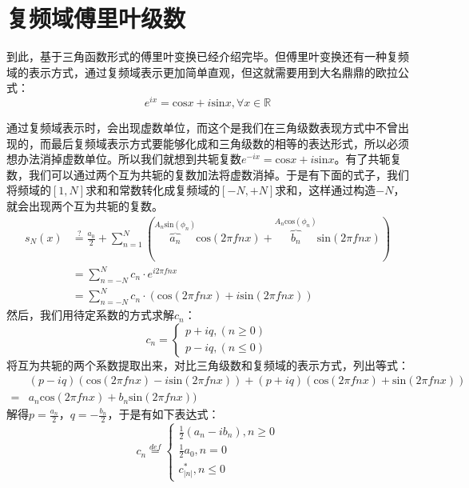 \documentclass[lang=cn,11pt,a4paper,cite=numbers]{elegantpaper}
\begin{document}
\section{复频域傅里叶级数}
  到此，基于三角函数形式的傅里叶变换已经介绍完毕。但傅里叶变换还有一种复频域的表示方式，通过复频域表示更加简单直观，但这就需要用到大名鼎鼎的欧拉公式：
\begin{equation}
  e^{ix}=\mathrm{cos}x+i\mathrm{sin}x, {\forall}x{\in}\mathbb{R}
\end{equation}

  通过复频域表示时，会出现虚数单位，而这个是我们在三角级数表现方式中不曾出现的，而最后复频域表示方式要能够化成和三角级数的相等的表达形式，所以必须想办法消掉虚数单位。所以我们就想到共轭复数$e^{-ix}=\mathrm{cos}x+i\mathrm{sin}x$。有了共轭复数，我们可以通过两个互为共轭的复数加法将虚数消掉。于是有下面的式子，我们将频域的$[1,N]$求和和常数转化成复频域的$[-N,+N]$求和，这样通过构造$-N$，就会出现两个互为共轭的复数。
\begin{equation}
  \begin{aligned}
    s_{N}(x)&\overset{?}{=}\frac{a_{0}}{2}+\sum_{n=1}^{N}\left(\overbrace{a_{n}}^{A_{n}\mathrm{sin}(\phi_{n})}\mathrm{cos}(2{\pi}fnx)+\overbrace{b_{n}}^{A_{n}\mathrm{cos}(\phi_{n})}\mathrm{sin}(2{\pi}fnx)\right)\\
      &=\sum_{n=-N}^{N}c_{n}{\cdot}e^{i2{\pi}fnx}\\
      &=\sum_{n=-N}^{N}c_{n}{\cdot}(\mathrm{cos}(2{\pi}fnx)+i\mathrm{sin}(2{\pi}fnx))
  \end{aligned}
\end{equation}
然后，我们用待定系数的方式求解$c_{n}$：
\begin{equation}
  c_{n}=\begin{cases}
    p+iq,(n \ge 0)\\
    p-iq,(n \le 0)
  \end{cases}
\end{equation}
将互为共轭的两个系数提取出来，对比三角级数和复频域的表示方式，列出等式：
\begin{equation}
  \begin{aligned}
    &(p-iq)(\mathrm{cos}(2{\pi}fnx)-i\mathrm{sin}(2{\pi}fnx))+(p+iq)(\mathrm{cos}(2{\pi}fnx)+\mathrm{sin}(2{\pi}fnx))\\
    =&a_{n}\mathrm{cos}(2{\pi}fnx)+b_{n}\mathrm{sin}(2{\pi}fnx))
  \end{aligned}
\end{equation}
解得$p=\frac{a_{n}}{2}$，$q=-\frac{b_{n}}{2}$，于是有如下表达式：
\begin{equation}
  c_{n}\overset{def}{=}\begin{cases}
    \frac{1}{2}(a_{n}-ib_{n}),n{\ge}0\\
    \frac{1}{2}a_{0},n=0\\
    c_{\left|n\right|}^{*},n{\le}0
  \end{cases}
\end{equation}
\end{document}
